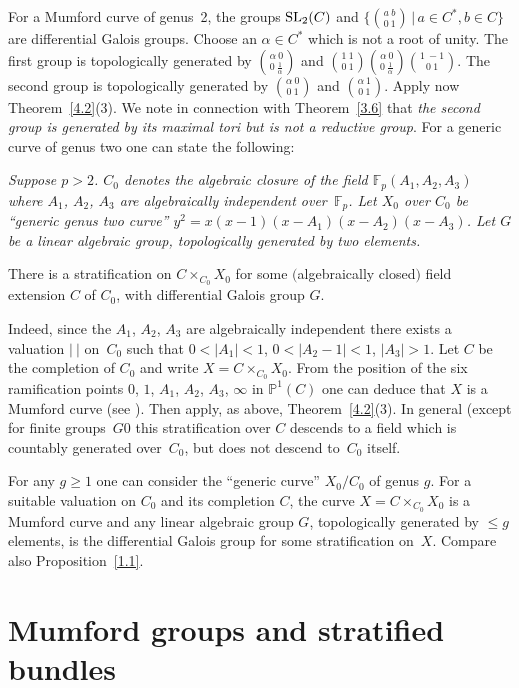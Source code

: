 \documentclass[pdftex]{sigma}
\numberwithin{equation}{section}
\begin{document}
\begin{Examples}\label{4.4} For a Mumford curve of genus~2, the groups ${\rm SL}_2(C)$ and $\big\{{a\ b \choose 0\ 1 }\,|\, a\in C^*,b\in C\big\}$ are differential Galois groups. Choose an $\alpha \in C^*$ which is not a root of unity. The first group is topologically generated by ${\alpha\ 0\choose 0\ \frac{1}{\alpha}}$ and ${1\ 1\choose 0\ 1 } {\alpha\ 0\choose 0\ \frac{1}{\alpha} }{1\ -1\choose 0\ 1 }$. The second group is topologically gene\-ra\-ted by ${\alpha\ 0\choose 0\ 1 }$ and ${\alpha \ 1\choose 0\ 1}$. Apply now Theorem~\ref{4.2}(3). We note in connection with Theorem~\ref{3.6} that {\it the second group is generated by its maximal tori but is not a reductive group}. For a generic curve of genus two one can state the following:

 {\it Suppose $p>2$. $C_0$ denotes the algebraic closure of the field $\mathbb{F}_p(A_1,A_2,A_3)$ where $A_1$, $A_2$, $A_3$ are algebraically independent over~$\mathbb{F}_p$. Let $X_0$ over $C_0$ be ``generic genus two curve'' $y^2=x(x-1)(x-A_1)(x-A_2)(x-A_3)$. Let $G$ be a linear algebraic group,
 topologically generated by two elements.

 There is a stratification on $C\times _{C_0}X_0$ for some $($algebraically closed$)$ field extension $C$ of $C_0$, with differential Galois group $G$.}

 Indeed, since the $A_1$, $A_2$, $A_3$ are algebraically independent there exists a valuation $| \ |$ on~$C_0$ such that $0<|A_1|<1$, $0<|A_2-1|<1$, $|A_3|>1$. Let $C$ be the completion of $C_0$ and write $X=C\times _{C_0}X_0$. From the position of the six ramification points $0$, $1$, $A_1$, $A_2$, $A_3$, $\infty$ in $\mathbb{P}^1(C)$ one can deduce that $X$ is a Mumford curve (see \cite[p.~168]{Ge-vdP}). Then apply, as above, Theorem~\ref{4.2}(3). In general (except for finite groups~$G$0 this stratification over $C$ descends to a field which is countably generated over~$C_0$, but does not descend to~$C_0$ itself.

 For any $g\geq 1$ one can consider the ``generic curve'' $X_0/C_0$ of genus $g$. For a suitable valuation on $C_0$ and its completion $C$, the curve $X=C\times_{C_0}X_0$ is a Mumford curve and any linear algebraic group $G$, topologically generated by $\leq g$ elements, is the differential Galois group for some stratification on~$X$. Compare also Proposition~\ref{1.1}.
 \end{Examples}

\section{Mumford groups and stratified bundles}\label{section5}
\end{document}
